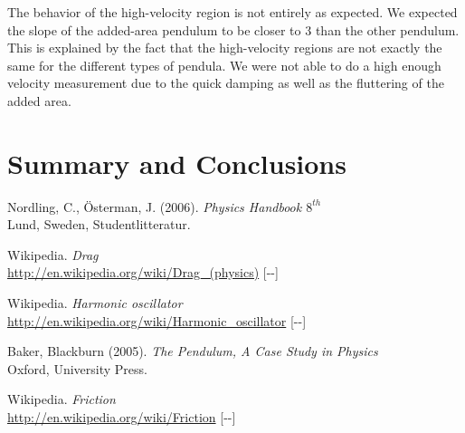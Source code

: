 ﻿\documentclass[11pt, a4paper]{article}
\newcommand{\todayswe}{\the\year-\twodigit\month-\twodigit\day}
\begin{document}
The behavior of the high-velocity region is not entirely as expected. We expected 
the slope of the added-area pendulum 
to be closer to $3$ than the other pendulum.
This is explained by the fact that the high-velocity regions are not exactly the 
same for the different types of pendula. We were not 
able to do a high enough velocity measurement due to the quick damping as well as 
the fluttering of the added area.
\section{Summary and Conclusions}
\vfill

\begin{thebibliography}{99}
	 Nordling, C., Österman, J. (2006). 
  \textit{Physics Handbook  $8^{th}$}\\
  Lund, Sweden, Studentlitteratur.

   Wikipedia. \textit{Drag}\\ 
  \url{http://en.wikipedia.org/wiki/Drag_(physics)} [\todayswe]

   Wikipedia. \textit{Harmonic oscillator}\\ 
  \url{http://en.wikipedia.org/wiki/Harmonic_oscillator} [\todayswe]

	 Baker, Blackburn (2005). 
  \textit{The Pendulum, A Case Study in Physics}\\
  Oxford, University Press.

   Wikipedia. \textit{Friction}\\ 
  \url{http://en.wikipedia.org/wiki/Friction} [\todayswe]

\end{thebibliography}

\begin{appendix}
\end{appendix}

\end{document}
